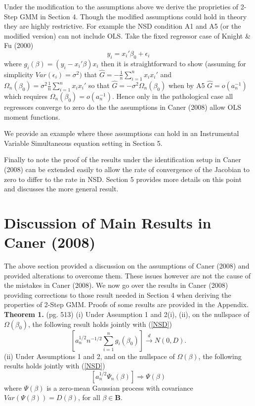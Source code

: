 \documentclass[11pt, fleqn]{article}
\begin{document}
Under the modification to the assumptions above we derive the proprieties of 2-Step GMM in Section 4.
Though the modified assumptions could hold in theory they are highly restrictive. For example the NSD condition A1 and A5 (or the modified version) can not include OLS. Take the fixed regressor case of Knight \& Fu (2000)
\begin{equation}
	y_i= x_i'\beta_0 +\epsilon_i
\end{equation}
where $g_i(\beta)=(y_i-x_i'\beta)x_i$
then it is straightforward to show (assuming for simplicity $Var(\epsilon_i)=\sigma^2)$ that 
$\hat{G}=-\frac{1}{n}\sum_{i=1}^n x_ix_i'$ and $\Omega_n(\beta_0)=\sigma^2\frac{1}{n}\sum_{i=1}^n x_ix_i'$ so that $\hat{G}=-\sigma^2\Omega_n(\beta_0)$ when by A5 $\hat{G}=o(a_n^{-1})$  which requires $\Omega_n(\beta_0)=o(a_n^{-1})$. Hence only in the pathological case all regressors converge to zero do the  the assumptions in Caner (2008)  allow OLS moment functions.

We provide an example where these assumptions can hold in an Instrumental Variable Simultaneous equation setting in Section 5.

Finally to note the proof of the results under the identification setup in Caner (2008) can be extended easily to allow the rate of convergence of the Jacobian to zero to differ to the rate in NSD. Section 5 provides more details on this point and discusses the more general result.









\section{Discussion of Main Results in Caner (2008)}


The above section provided a discussion on the assumptions of Caner (2008) and provided  alterations to overcome them.  These  issues however are not the cause of the mistakes in Caner (2008).   We now go over the results in Caner (2008) providing corrections to those result needed in Section 4 when deriving the properties of 2-Step GMM. Proofs of some results are provided in the Appendix.\\

\textbf{Theorem 1.} (pg. 513) (i) Under Assumption 1 and 2(i), (ii), on the nullspace of $\Omega(\beta_0)$, the following result holds jointly with (\ref{NSD})
\begin{equation} \left[ a_n^{1/2}n^{-1/2}\sum_{i=1}^n g_i(\beta_0)\right] \overset{d}{\rightarrow} N(0,D). \end{equation}
(ii) Under Assumptions 1 and 2, and on the nullspace of $\Omega(\beta)$, the following results holds jointly with (\ref{NSD})
\begin{equation}\left[ a_n^{1/2}\Psi_n(\beta)\right] \Longrightarrow \Psi(\beta) \end{equation}
where $\Psi(\beta)$ is a zero-mean Gaussian process with covariance $Var(\Psi(\beta))=D(\beta)$, for all $\beta \in \mathbf{B}$.\\
\end{document}
